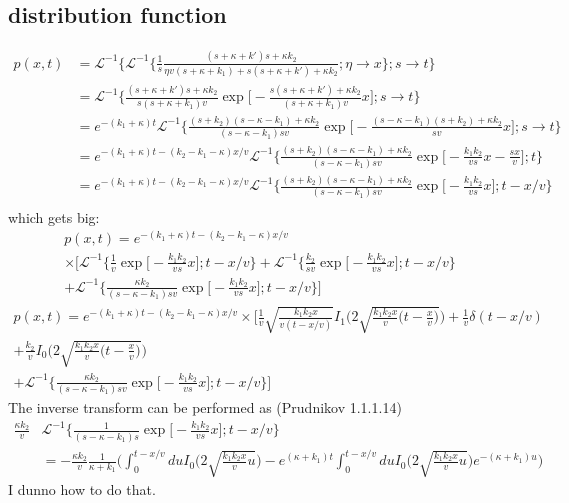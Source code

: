 \documentclass[11pt]{article}
\newcommand\El{\mathcal{L}}
\begin{document}
\subsection{distribution function}

\begin{align}
p(x,t) &= \El^{-1} \Big\{\El^{-1}\Big\{\frac{1}{s} \frac{(s+\kappa+k')s + \kappa k_2}{\eta v(s + \kappa + k_1) + s(s+ \kappa + k') + \kappa k_2};\eta\rightarrow x\Big\};s\rightarrow t\Big\}\\
&= \El^{-1}\Big\{\frac{(s+\kappa + k')s + \kappa k_2}{s(s+\kappa + k_1)v}\exp\Big[-\frac{s(s+\kappa + k')+\kappa k_2}{(s+\kappa +k_1)v}x\Big];s\rightarrow t\Big\} \\
&= e^{-(k_1 + \kappa)t}\El^{-1}\Big\{ \frac{(s + k_2)(s-\kappa -k_1)+\kappa k_2}{(s-\kappa-k_1)sv} \exp\Big[-\frac{(s-\kappa-k_1)(s+k_2)+\kappa k_2}{sv}x\Big] ;s\rightarrow t\Big\}\\
&= e^{-(k_1 + \kappa)t - (k_2-k_1-\kappa)x/v}\El^{-1}\Big\{ \frac{(s + k_2)(s-\kappa -k_1)+\kappa k_2}{(s-\kappa-k_1)sv} \exp\Big[-\frac{k_1k_2}{vs}x - \frac{sx}{v}\Big] ;t\Big\}\\
&= e^{-(k_1 + \kappa)t - (k_2-k_1-\kappa)x/v}\El^{-1}\Big\{ \frac{(s + k_2)(s-\kappa -k_1)+\kappa k_2}{(s-\kappa-k_1)sv} \exp\Big[-\frac{k_1k_2}{vs}x\Big] ;t-x/v\Big\}\\
\end{align}
which gets big:
\begin{multline}
p(x,t) = e^{-(k_1 + \kappa)t - (k_2-k_1-\kappa)x/v} \\
\times \Big[ \El^{-1}\Big\{\frac{1}{v}\exp\Big[-\frac{k_1k_2}{vs}x\Big];t-x/v\Big\} 
+ \El^{-1}\Big\{\frac{k_2}{sv}\exp\Big[-\frac{k_1k_2}{vs}x\Big];t-x/v\Big\} \\
+ \El^{-1}\Big\{\frac{\kappa k_2}{(s-\kappa-k_1)sv}\exp\Big[-\frac{k_1k_2}{vs}x\Big];t-x/v\Big\}
\Big]
\end{multline}
\begin{multline}
p(x,t) = e^{-(k_1 + \kappa)t - (k_2-k_1-\kappa)x/v} 
\times \Big[ \frac{1}{v}\sqrt{\frac{k_1 k_2 x}{v (t-x/v)}}I_1\Big(2\sqrt{\frac{k_1k_2 x}{v}\big(t-\frac{x}{v}\big)}\Big) + \frac{1}{v}\delta(t-x/v) \\ + \frac{k_2}{v} I_0\Big(2\sqrt{\frac{k_1k_2 x}{v}\big(t-\frac{x}{v}\big)}\Big) \\
+ \El^{-1}\Big\{\frac{\kappa k_2}{(s-\kappa-k_1)sv}\exp\Big[-\frac{k_1k_2}{vs}x\Big];t-x/v\Big\}
\Big]
\end{multline}
The inverse transform can be performed as (Prudnikov 1.1.1.14)
\begin{align}
 \frac{\kappa k_2}{v} &\El^{-1}\Big\{\frac{1}{(s-\kappa-k_1)s}\exp\Big[-\frac{k_1k_2}{vs}x\Big];t-x/v\Big\}\\
&=-\frac{\kappa k_2}{v}\frac{1}{\kappa + k_1}\Big(\int_0^{t-x/v} du I_0\Big(2\sqrt{\frac{k_1k_2 x}{v}u}\Big) - e^{(\kappa + k_1)t}\int_0^{t-x/v} du I_0\Big(2\sqrt{\frac{k_1k_2 x}{v}u}\Big)e^{-(\kappa + k_1)u}\Big)
\end{align}
I dunno how to do that.
\end{document}
